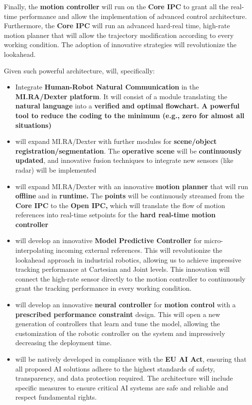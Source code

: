 Finally, the \textbf{motion controller} will run on the \textbf{Core
IPC} to grant all the real-time performance and allow the implementation
of advanced control architecture. Furthermore, the \textbf{Core IPC}
will run an advanced hard-real time, high-rate motion planner that will
allow the trajectory modification according to every working condition.
The adoption of innovative strategies will revolutionize the lookahead.

Given such powerful architecture,  will, specifically:

\begin{itemize}
\item
  Integrate \textbf{Human-Robot Natural Communication} in the
  \textbf{MI.RA/Dexter platform}. It will consist of a module
  translating the \textbf{natural language} into a \textbf{verified and
  optimal flowchart. A powerful tool to reduce the coding to the minimum
  (e.g., zero for almost all situations)}
\item
   will expand MI.RA/Dexter with further modules for
  \textbf{scene/object registration/segmentation}. The \textbf{operative
  scene} will be \textbf{continuously updated}, and innovative fusion
  techniques to integrate new sensors (like radar) will be implemented
\item
   will expand MI.RA/Dexter with an innovative
  \textbf{motion planner} that will run \textbf{offline} and in
  \textbf{runtime.} The \textbf{points} will be continuously streamed
  from the \textbf{Core IPC} to the \textbf{Open IPC,} which will
  translate the flow of motion references into real-time setpoints for
  the \textbf{hard real-time motion controller}
\item
   will develop an innovative \textbf{Model Predictive
  Controller} for micro-interpolating incoming external references. This
  will revolutionize the lookahead approach in industrial robotics,
  allowing us to achieve impressive tracking performance at Cartesian
  and Joint levels. This innovation will connect the high-rate sensor
  directly to the motion controller to continuously grant the tracking
  performance in every working condition.
\item
   will develop an innovative \textbf{neural
  controller} for \textbf{motion control} with a \textbf{prescribed
  performance constraint} design. This will open a new generation of
  controllers that learn and tune the model, allowing the customization
  of the robotic controller on the system and impressively decreasing
  the deployment time.
\item
   will be natively developed in compliance with the
  \textbf{EU AI Act}, ensuring that all proposed AI solutions adhere to
  the highest standards of safety, transparency, and data protection
  required. The architecture will include specific measures to ensure
  critical AI systems are safe and reliable and respect fundamental
  rights.
\end{itemize}


